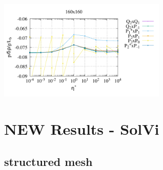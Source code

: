 \begin{center}
\includegraphics[width=8cm]{python_codes/fieldstone_120/paperresults/sinker_reduced/structured/sinker_reduced_press_160}\\
\end{center}




\newpage
\section*{NEW Results - SolVi}

\subsection*{structured mesh}


